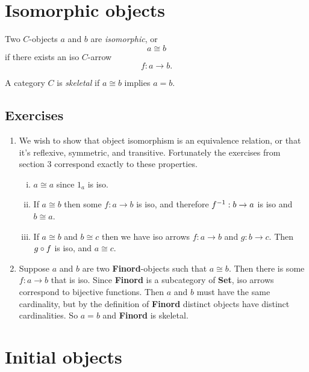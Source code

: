 \documentclass[12pt]{article}
\begin{document}
\section{Isomorphic objects}

    \begin{definition}
        Two $C$-objects $a$ and $b$ are \emph{isomorphic}, or 
        $$a \cong b$$ 
        if there exists an iso $C$-arrow
        $$f: a \to b.$$
    \end{definition}

    \begin{definition}
        A category $C$ is \emph{skeletal} if $a \cong b$ implies $a = b$.
    \end{definition}

    \subsection*{Exercises}
        \begin{enumerate}
            \item We wish to show that object isomorphism is an equivalence relation, or that it's reflexive, symmetric, and transitive. Fortunately the exercises from section 3 correspond exactly to these properties.
            \begin{enumerate}[(i)]
                \item $a \cong a$ since $1_a$ is iso.
                \item If $a \cong b$ then some $f : a \to b$ is iso, and therefore $f^{-1} : b \to a$ is iso and $b \cong a$.
                \item If $a \cong b$ and $b \cong c$ then we have iso arrows $f : a \to b$ and $g : b \to c$. Then $g \circ f$ is iso, and $a \cong c$.
            \end{enumerate}

            \item Suppose $a$ and $b$ are two \textbf{Finord}-objects such that $a \cong b$. Then there is some $f : a \to b$ that is iso.
            Since \textbf{Finord} is a subcategory of \textbf{Set}, iso arrows correspond to bijective functions.
            Then $a$ and $b$ must have the same cardinality, but by the definition of \textbf{Finord} distinct objects have distinct cardinalities. So $a = b$ and \textbf{Finord} is skeletal.
            
        \end{enumerate}


\section{Initial objects}
\end{document}
